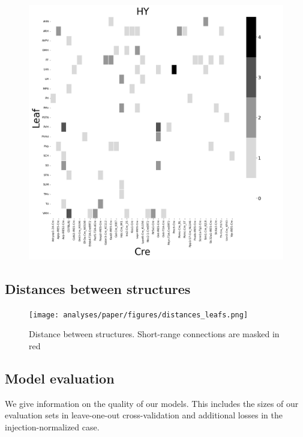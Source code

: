 \begin{figure}[H]
    \centering
    \includegraphics[width = 7in]{figs/HY centroid density.png} 
    \label{fig:my_label}
\end{figure}

\newpage

\subsection{Distances between structures}

\begin{figure}[H]
    \centering
    \texttt{[image: analyses/paper/figures/distances\_leafs.png]} 
    \caption{Distance between structures.  Short-range connections are masked in red}
    \label{fig:dist_bw_str}
\end{figure}

\newpage

\subsection{Model evaluation}
\label{supp_sec:model-evaluation}

We give information on the quality of our models.
This includes the sizes of our evaluation sets in leave-one-out cross-validation and additional losses in the injection-normalized case.


